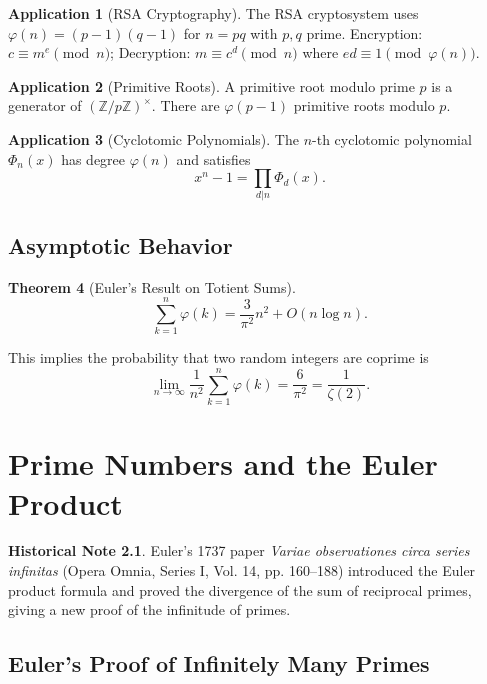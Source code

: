 \documentclass[11pt,a4paper,twoside]{book}
\theoremstyle{eulerstyle}
\newtheorem{theorem}{Theorem}[chapter]
\theoremstyle{definition}
\newtheorem{historical}[theorem]{Historical Note}
\newtheorem{application}[theorem]{Application}
\newcommand{\Z}{\mathbb{Z}}
\begin{document}
\begin{application}[RSA Cryptography]
The RSA cryptosystem uses $\varphi(n) = (p-1)(q-1)$ for $n=pq$ with $p,q$ prime. 
Encryption: $c \equiv m^e \pmod{n}$; Decryption: $m \equiv c^d \pmod{n}$ where $ed \equiv 1 \pmod{\varphi(n)}$.
\end{application}

\begin{application}[Primitive Roots]
A primitive root modulo prime $p$ is a generator of $(\Z/p\Z)^\times$. There are $\varphi(p-1)$ primitive roots modulo $p$.
\end{application}

\begin{application}[Cyclotomic Polynomials]
The $n$-th cyclotomic polynomial $\Phi_n(x)$ has degree $\varphi(n)$ and satisfies
\[
x^n - 1 = \prod_{d|n} \Phi_d(x).
\]
\end{application}

\section{Asymptotic Behavior}

\begin{theorem}[Euler's Result on Totient Sums]
\[
\sum_{k=1}^n \varphi(k) = \frac{3}{\pi^2} n^2 + O(n \log n).
\]
\end{theorem}

This implies the probability that two random integers are coprime is
\[
\lim_{n \to \infty} \frac{1}{n^2} \sum_{k=1}^n \varphi(k) = \frac{6}{\pi^2} = \frac{1}{\zeta(2)}.
\]

\cleardoublepage

\chapter{Prime Numbers and the Euler Product}
\label{ch:primes}

\begin{historical}
Euler's 1737 paper \emph{Variae observationes circa series infinitas} (Opera Omnia, Series I, Vol. 14, pp. 160--188) introduced the Euler product formula and proved the divergence of the sum of reciprocal primes, giving a new proof of the infinitude of primes. \cite{euler1737}\end{historical}

\section{Euler's Proof of Infinitely Many Primes}
\end{document}
